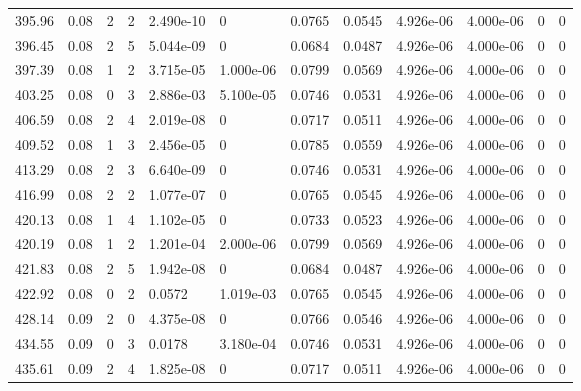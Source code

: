 \documentclass[preview]{standalone}
\begin{document}
{{{{\begin{tabular}{L{1.2cm}C{1.2cm} C{0.3cm}C{0.5cm} C{1.4cm}C{1.4cm} C{1.4cm}C{1.4cm} C{1.6cm}C{1.6cm} C{1.6cm}C{1.6cm}}
  395.96  &  0.08  & 2     &  2 &  2.490e-10  & 0  &  0.0765&   0.0545& 4.926e-06 & 4.000e-06   &  0 & 0  \\ 
  396.45  &  0.08  & 2     &  5 &  5.044e-09  & 0  &  0.0684&   0.0487& 4.926e-06 & 4.000e-06   &  0 & 0  \\ 
  397.39  &  0.08  & 1     &  2 &  3.715e-05  & 1.000e-06  &  0.0799&   0.0569& 4.926e-06 & 4.000e-06   &  0 & 0  \\ 
  403.25  &  0.08  & 0     &  3 &  2.886e-03  & 5.100e-05  &  0.0746&   0.0531& 4.926e-06 & 4.000e-06   &  0 & 0  \\ 
  406.59  &  0.08  & 2     &  4 &  2.019e-08  & 0  &  0.0717&   0.0511& 4.926e-06 & 4.000e-06   &  0 & 0  \\ 
  409.52  &  0.08  & 1     &  3 &  2.456e-05  & 0  &  0.0785&   0.0559& 4.926e-06 & 4.000e-06   &  0 & 0  \\ 
  413.29  &  0.08  & 2     &  3 &  6.640e-09  & 0  &  0.0746&   0.0531& 4.926e-06 & 4.000e-06   &  0 & 0  \\ 
  416.99  &  0.08  & 2     &  2 &  1.077e-07  & 0  &  0.0765&   0.0545& 4.926e-06 & 4.000e-06   &  0 & 0  \\ 
  420.13  &  0.08  & 1     &  4 &  1.102e-05  & 0  &  0.0733&   0.0523& 4.926e-06 & 4.000e-06   &  0 & 0  \\ 
  420.19  &  0.08  & 1     &  2 &  1.201e-04  & 2.000e-06  &  0.0799&   0.0569& 4.926e-06 & 4.000e-06   &  0 & 0  \\ 
  421.83  &  0.08  & 2     &  5 &  1.942e-08  & 0  &  0.0684&   0.0487& 4.926e-06 & 4.000e-06   &  0 & 0  \\ 
  422.92  &  0.08  & 0     &  2 &  0.0572  & 1.019e-03  &  0.0765&   0.0545& 4.926e-06 & 4.000e-06   &  0 & 0  \\ 
  428.14  &  0.09  & 2     &  0 &  4.375e-08  & 0  &  0.0766&   0.0546& 4.926e-06 & 4.000e-06   &  0 & 0  \\ 
  434.55  &  0.09  & 0     &  3 &  0.0178  & 3.180e-04  &  0.0746&   0.0531& 4.926e-06 & 4.000e-06   &  0 & 0  \\ 
  435.61  &  0.09  & 2     &  4 &  1.825e-08  & 0  &  0.0717&   0.0511& 4.926e-06 & 4.000e-06   &  0 & 0  \\ 
\hline 
\end{tabular} 

}}}}
\end{document}
